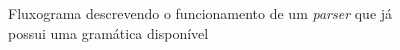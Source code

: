 \begin{figure}[!ht]
    \centering
    
    \caption[Fluxograma - parser]{Fluxograma descrevendo o funcionamento de um \textit{parser} que já possui uma gramática disponível}
    \label{fig:fluxograma_parser}
\end{figure}